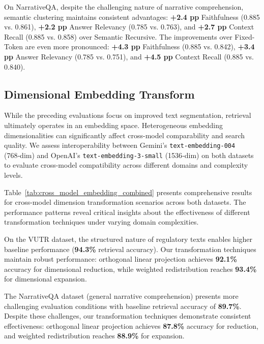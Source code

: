 \documentclass[10pt,twocolumn,letterpaper]{article}
\begin{document}
On NarrativeQA, despite the challenging nature of narrative comprehension, semantic clustering maintains consistent advantages: \textbf{+2.4 pp} Faithfulness (0.885 vs. 0.861), \textbf{+2.2 pp} Answer Relevancy (0.785 vs. 0.763), and \textbf{+2.7 pp} Context Recall (0.885 vs. 0.858) over Semantic Recursive. The improvements over Fixed-Token are even more pronounced: \textbf{+4.3 pp} Faithfulness (0.885 vs. 0.842), \textbf{+3.4 pp} Answer Relevancy (0.785 vs. 0.751), and \textbf{+4.5 pp} Context Recall (0.885 vs. 0.840).

\subsection{Dimensional Embedding Transform}

While the preceding evaluations focus on improved text segmentation, retrieval ultimately operates in an embedding space. Heterogeneous embedding dimensionalities can significantly affect cross-model comparability and search quality. We assess interoperability between Gemini's \texttt{text-embedding-004} (768‑dim) and OpenAI's \texttt{text-embedding-3-small} (1536‑dim) on both datasets to evaluate cross-model compatibility across different domains and complexity levels.

\vspace{0.5em}
Table~\ref{tab:cross_model_embedding_combined} presents comprehensive results for cross-model dimension transformation scenarios across both datasets. The performance patterns reveal critical insights about the effectiveness of different transformation techniques under varying domain complexities.

\vspace{0.5em}
On the VUTR dataset, the structured nature of regulatory texts enables higher baseline performance (\textbf{94.3\%} retrieval accuracy). Our transformation techniques maintain robust performance: orthogonal linear projection achieves \textbf{92.1\%} accuracy for dimensional reduction, while weighted redistribution reaches \textbf{93.4\%} for dimensional expansion.

\vspace{0.5em}
The NarrativeQA dataset (general narrative comprehension) presents more challenging evaluation conditions with baseline retrieval accuracy of \textbf{89.7\%}. Despite these challenges, our transformation techniques demonstrate consistent effectiveness: orthogonal linear projection achieves \textbf{87.8\%} accuracy for reduction, and weighted redistribution reaches \textbf{88.9\%} for expansion.
\end{document}
